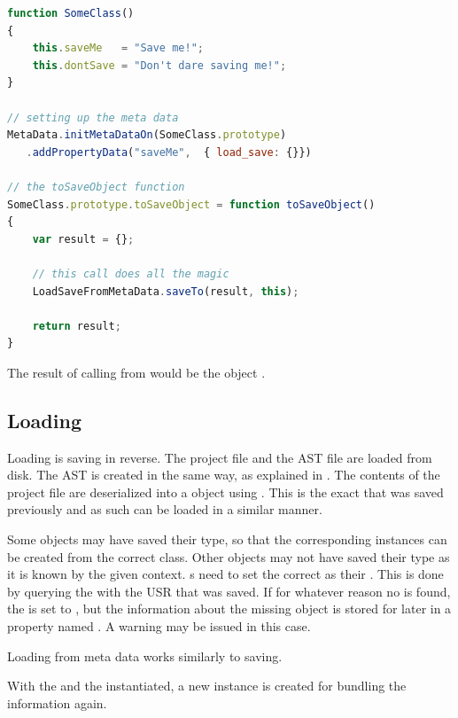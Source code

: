 \SingleSpacing
\begin{lstlisting}[language=JavaScript, caption=Saving using meta data, label=lst:MetaDataSave]
function SomeClass()
{
	this.saveMe   = "Save me!";
	this.dontSave = "Don't dare saving me!";
}

// setting up the meta data
MetaData.initMetaDataOn(SomeClass.prototype)
   .addPropertyData("saveMe",  { load_save: {}})

// the toSaveObject function
SomeClass.prototype.toSaveObject = function toSaveObject()
{
	var result = {};
	
	// this call does all the magic
	LoadSaveFromMetaData.saveTo(result, this);
	
	return result;
}
\end{lstlisting}
\OnehalfSpacing

The result of calling  from  would be the  object .

\subsection{Loading}

Loading is saving in reverse. The project file and the  AST file are loaded from disk. The  AST is created in the same way, as explained in . The contents of the project file are deserialized into a  object using . This is the exact  that was saved previously and as such can be loaded in a similar manner.

Some objects may have saved their type, so that the corresponding instances can be created from the correct class. Other objects may not have saved their type as it is known by the given context. s need to set the correct  as their . This is done by querying the  with the USR that was saved. If for whatever reason no  is found, the  is set to , but the information about the missing object is stored for later in a property named . A warning may be issued in this case.

Loading from meta data works similarly to saving.

With the  and the  instantiated, a new  instance is created for bundling the information again.

